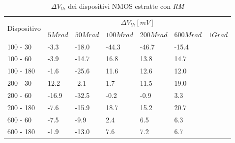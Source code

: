 \documentclass[12pt, letterpaper]{book}
\begin{document}
\begin{table}[H]
  \renewcommand{\arraystretch}{1.3}
  \begin{tabular}{m{2cm}  m{1.1cm} m{1.3cm} m{1.5cm} m{1.5cm} m{1.5cm} m{1cm}}
    \toprule
    \multirow{2}{*}{Dispositivo} & \multicolumn{6}{c}{$\Delta V_{th} [mV] $}                                                          \\
    \cmidrule{2-7}
                                 & $5Mrad$                            & $50Mrad$ & $100Mrad$ & $200Mrad$ & $600Mrad$ & $1Grad$ \\
    \midrule
    100 - 30                     & -3.3                               & -18.0    & -44.3     & -46.7     & -15.4     &         \\
    \hline
    100 - 60                     & -3.9                               & -14.7    & 16.8      & 13.8      & 14.7      &         \\
    \hline
    100 - 180                     & -1.6                               & -25.6    & 11.6      & 12.6      & 12.0      &         \\
    \hline
    200 - 30                     & 12.2                               & -2.1     & 1.7       & 11.5      & 19.0      &         \\
    \hline
    200 - 60                    & -16.9                              & -32.5    & -0.2      & -0.9      & 3.3       &         \\
    \hline
    200 - 180                    & -7.6                               & -15.9    & 18.7      & 15.2      & 20.7      &         \\
    \hline
    600 - 60                     & -7.5                               & -9.9     & 2.4       & 6.5       & 6.3       &         \\
    \hline
    600 - 180                    & -1.9                               & -13.0    & 7.6       & 7.2       & 6.7       &         \\
    \bottomrule
  \end{tabular}
  \caption{$\Delta V_{th}$ dei dispositivi NMOS estratte con \emph{RM}}
  \label{tab:deltaVthRMN}
\end{table}
\end{document}

